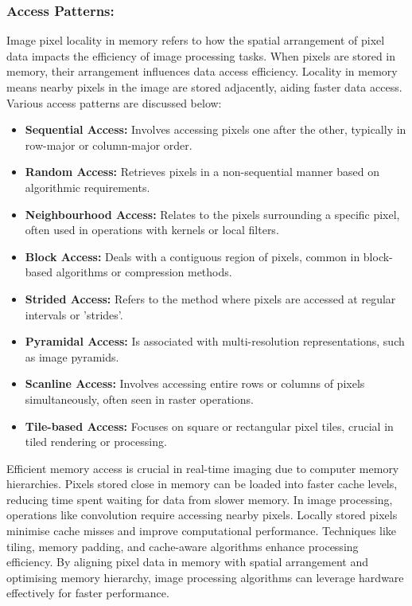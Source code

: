 \subsubsection{Access Patterns:}
Image pixel locality in memory refers to how the spatial arrangement of pixel data impacts the efficiency of image processing tasks. When pixels are stored in memory, their arrangement influences data access efficiency. Locality in memory means nearby pixels in the image are stored adjacently, aiding faster data access. Various access patterns are discussed below:


\begin{itemize}
  \item \textbf{Sequential Access:} Involves accessing pixels one after the other, typically in row-major or column-major order.
  \item \textbf{Random Access:} Retrieves pixels in a non-sequential manner based on algorithmic requirements.
  \item \textbf{Neighbourhood Access:} Relates to the pixels surrounding a specific pixel, often used in operations with kernels or local filters.
  \item \textbf{Block Access:} Deals with a contiguous region of pixels, common in block-based algorithms or compression methods.
  \item \textbf{Strided Access:} Refers to the method where pixels are accessed at regular intervals or 'strides'.
  \item \textbf{Pyramidal Access:} Is associated with multi-resolution representations, such as image pyramids.
  \item \textbf{Scanline Access:} Involves accessing entire rows or columns of pixels simultaneously, often seen in raster operations.
  \item \textbf{Tile-based Access:} Focuses on square or rectangular pixel tiles, crucial in tiled rendering or processing.
\end{itemize}


Efficient memory access is crucial in real-time imaging due to computer memory hierarchies. Pixels stored close in memory can be loaded into faster cache levels, reducing time spent waiting for data from slower memory. In image processing, operations like convolution require accessing nearby pixels. Locally stored pixels minimise cache misses and improve computational performance. Techniques like tiling, memory padding, and cache-aware algorithms enhance processing efficiency. By aligning pixel data in memory with spatial arrangement and optimising memory hierarchy, image processing algorithms can leverage hardware effectively for faster performance.


